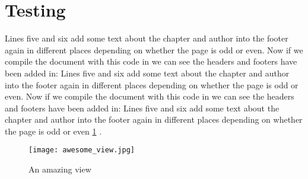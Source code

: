  \section{Testing} \par Lines five and six add some text about the chapter and author into the footer again in different places depending on whether the page is odd or even. Now if we compile the document with this code in we can see the headers and footers have been added in: Lines five and six add some text about the chapter and author into the footer again in different places depending on whether the page is odd or even. Now if we compile the document with this code in we can see the headers and footers have been added in: Lines five and six add some text about the chapter and author into the footer again in different places depending on whether the page is odd or even \ref{fig: awesome_view} \cite{einstein}.
 
 \begin{figure}[h]
 \centering
 \texttt{[image: awesome\_view.jpg]}
 \caption{An amazing view}
 \label{fig: awesome_view}
 \end{figure}
 

